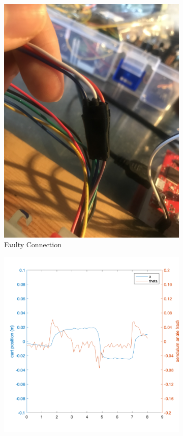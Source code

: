 \documentclass[12pt]{article}
\begin{document}
\begin{figure}[H]
    \centering
    \begin{subfigure}{.49\textwidth}
      \centering
      \includegraphics[width=1\linewidth]{figures/IMG_5968.jpg}
      \caption{Faulty Connection}
      \label{fig:conn}
    \end{subfigure}
    \begin{subfigure}{.4\textwidth}
      \centering
      \includegraphics[width=1\linewidth]{figures/noise.png}

\end{subfigure}
\end{figure}
\end{document}
